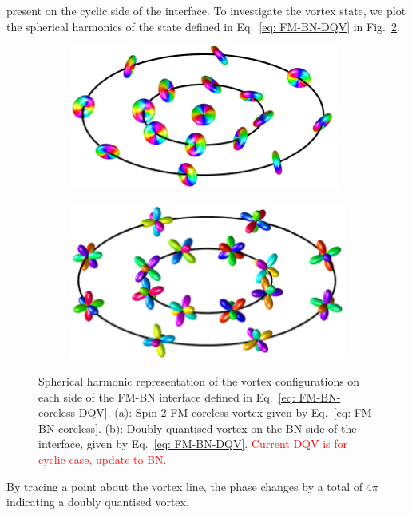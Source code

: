 present on the cyclic side of the interface.
To investigate the vortex state, we plot the spherical harmonics of the state
defined in Eq.~\eqref{eq: FM-BN-DQV} in
Fig.~\ref{subfig: DQV-initial}.
\begin{figure}
    \centering
    \begin{subfigure}{0.45\textwidth}
        \includegraphics[width=\textwidth]
        {gfx/ch-spin2/C-FM=2_coreless_FM_init_spherical.pdf}
        \caption{\label{subfig: coreless-initial}}
    \end{subfigure}
    \begin{subfigure}{0.45\textwidth}
        \includegraphics[width=\textwidth]
        {gfx/ch-spin2/C-FM=2_coreless_cyclic_init_spherical.pdf}
        \caption{\label{subfig: DQV-initial}}
    \end{subfigure}
    \caption{\label{fig: coreless-doubly-quantised} Spherical harmonic
        representation of the vortex configurations on each side of the FM-BN
        interface defined in Eq.~\eqref{eq: FM-BN-coreless-DQV}.
        (a): Spin-2 FM coreless vortex given by Eq.~\eqref{eq: FM-BN-coreless}.
        (b): Doubly quantised vortex on the BN side of the interface, given by
        Eq.~\eqref{eq: FM-BN-DQV}.
        \textcolor{red}{Current DQV is for cyclic case, update to BN.}}
\end{figure}
By tracing a point about the vortex line, the phase changes by a total of
\(4\pi \) indicating a doubly quantised vortex.

